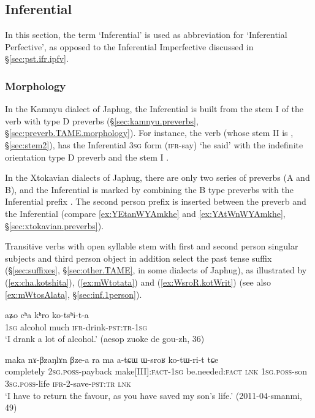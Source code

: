 \subsection{Inferential} \label{sec:ifr}
In this section, the term `Inferential' is used as abbreviation for `Inferential Perfective', as opposed to the Inferential Imperfective discussed in §\ref{sec:pst.ifr.ipfv}.

\subsubsection{Morphology}   \label{sec:ifr.morphology}
In the Kamnyu dialect of Japhug, the Inferential is built from the stem I of the verb with type D preverbs (§\ref{sec:kamnyu.preverbs}, §\ref{sec:preverb.TAME.morphology}). For instance, the verb  (whose stem II is , §\ref{sec:stem2}), has the Inferential \textsc{3sg} form  (\textsc{ifr}-say) `he said' with the indefinite orientation type D preverb  and the stem I .

In the Xtokavian dialects of Japhug, there are only two series of preverbs (A and B), and the Inferential is marked by combining the B type preverbs with the Inferential prefix . The second person prefix  is inserted between the preverb and the Inferential  (compare \ref{ex:YEtanWYAmkhe} and \ref{ex:YAtWnWYAmkhe}, §\ref{sec:xtokavian.preverbs}).

Transitive verbs with open syllable stem with first  and second person singular subjects and third person object in addition select the  past tense suffix (§\ref{sec:suffixes}, §\ref{sec:other.TAME},  in some dialects of Japhug), as illustrated by (\ref{ex:cha.kotshita}), (\ref{ex:mWtotata}) and (\ref{ex:WsroR.kotWrit}) (see also \ref{ex:mWtosAlata}, §\ref{sec:inf.1person}).

\begin{exe}
\ex \label{ex:cha.kotshita}
\gll aʑo cʰa kʰro ko-tsʰi-t-a \\
\textsc{1sg} alcohol much \textsc{ifr}-drink-\textsc{pst}:\textsc{tr}-\textsc{1sg} \\
\glt `I drank a lot of alcohol.' (aesop zuoke de gou-zh, 36)
\end{exe}

\begin{exe}
\ex \label{ex:WsroR.kotWrit}
\gll maka nɤ-βzaŋlɤn βze-a ra ma a-tɕɯ ɯ-sroʁ ko-tɯ-ri-t tɕe \\
completely \textsc{2sg}.\textsc{poss}-payback make[III]:\textsc{fact}-\textsc{1sg} be.needed:\textsc{fact} \textsc{lnk} \textsc{1sg}.\textsc{poss}-son \textsc{3sg}.\textsc{poss}-life \textsc{ifr}-2-save-\textsc{pst}:\textsc{tr} \textsc{lnk} \\
\glt `I have to return the favour, as you have saved my son's life.' (2011-04-smanmi, 49)
\end{exe}

